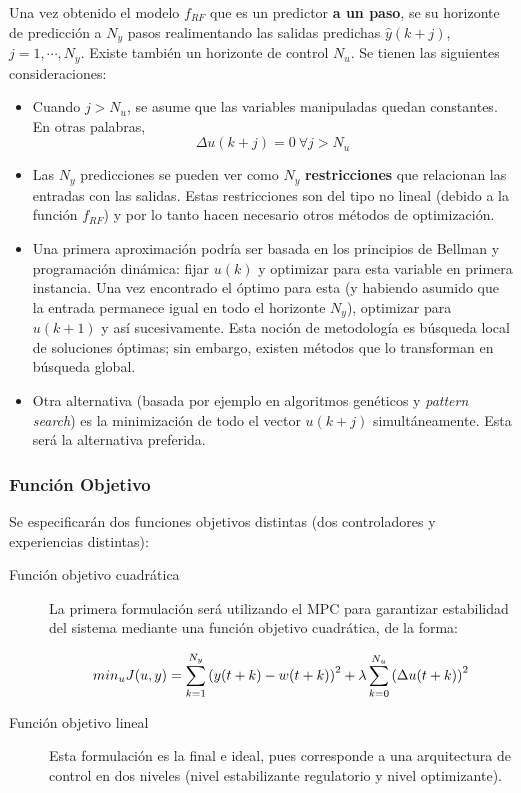 \documentclass{article}
\begin{document}
Una vez obtenido el modelo $f_{RF}$ que es un predictor \textbf{a un paso}, se  su horizonte de predicción a $N_y$ pasos realimentando las salidas predichas $\hat{y}(k+j)$, $j = {1,\cdots,N_y}$. Existe también un horizonte de control $N_u$. Se tienen las siguientes consideraciones:
\begin{itemize}
\item Cuando $j > N_u$, se asume que las variables manipuladas quedan constantes. En otras palabras, $$\Delta u(k+j) = 0 \: \forall j > N_u$$
\item Las $N_y$ predicciones se pueden ver como $N_y$ \textbf{restricciones} que relacionan las entradas con las salidas. Estas restricciones son del tipo no lineal (debido a la función $f_{RF}$) y por lo tanto hacen necesario otros métodos de optimización.
\item Una primera aproximación podría ser basada en los principios de Bellman y programación dinámica: fijar $u(k)$ y optimizar para esta variable en primera instancia. Una vez encontrado el óptimo para esta (y habiendo asumido que la entrada permanece igual en todo el horizonte $N_y$), optimizar para $u(k+1)$ y así sucesivamente. Esta noción de metodología es búsqueda local de soluciones óptimas; sin embargo, existen métodos que lo transforman en búsqueda global.
\item Otra alternativa (basada por ejemplo en algoritmos genéticos y \textit{pattern search}) es la minimización de todo el vector $u(k+j)$ simultáneamente. Esta será la alternativa preferida.
\end{itemize}

\subsubsection{Función Objetivo}
Se especificarán dos funciones objetivos distintas (dos controladores y experiencias distintas):
\begin{description}
\item[Función objetivo cuadrática] La primera formulación será utilizando el MPC para garantizar estabilidad del sistema mediante una función objetivo cuadrática, de la forma:

\bseq{}\label{eq:funcObj1Caldera}
\begin{gather}
min_{u}J(u,y) = \sum_{k = 1}^{N_y}\left( y(t+k)-w(t+k) \right)^2+\lambda \sum_{k = 0}^{N_u}\left( \Delta u(t+k) \right)^2
\end{gather}
\eseq{}


\item[Función objetivo lineal] Esta formulación es la final e ideal, pues corresponde a una arquitectura de control en dos niveles (nivel estabilizante regulatorio y nivel optimizante). 
\end{description}
\end{document}
